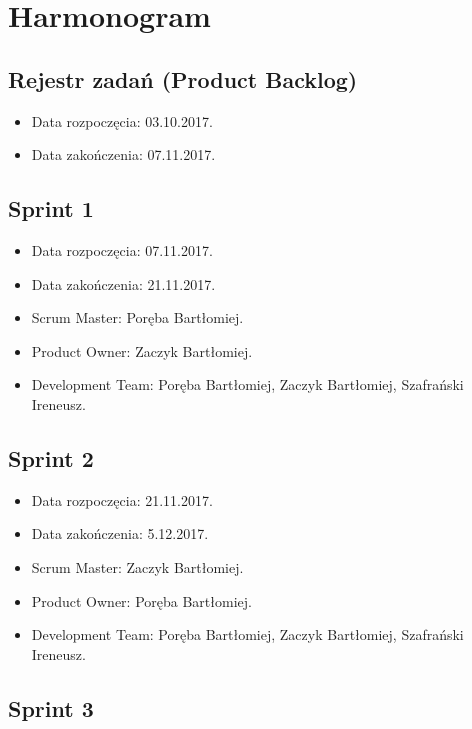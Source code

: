 \documentclass[a4paper]{article}
\begin{document}
	
	\section{Harmonogram}
	
	\subsection{Rejestr zadań (Product Backlog)}
	
	\begin{itemize}
		\item Data rozpoczęcia: 03.10.2017.
		\item  Data zakończenia: 07.11.2017.
	\end{itemize}
	
	\subsection{Sprint 1}
	
	\begin{itemize}
		\item Data rozpoczęcia: 07.11.2017.
		\item Data zakończenia: 21.11.2017.
		\item Scrum Master: Poręba Bartłomiej.
		\item Product Owner: Zaczyk Bartłomiej.
		\item Development Team: Poręba Bartłomiej, Zaczyk Bartłomiej, Szafrański Ireneusz.
	\end{itemize}
	
	\subsection{Sprint 2}
	
	\begin{itemize}
		\item Data rozpoczęcia: 21.11.2017.
		\item  Data zakończenia: 5.12.2017.
		\item Scrum Master: Zaczyk Bartłomiej.
		\item Product Owner: Poręba Bartłomiej.
		\item Development Team: Poręba Bartłomiej, Zaczyk Bartłomiej, Szafrański Ireneusz.
	\end{itemize}
	
	\subsection{Sprint 3}
	
\end{document}
